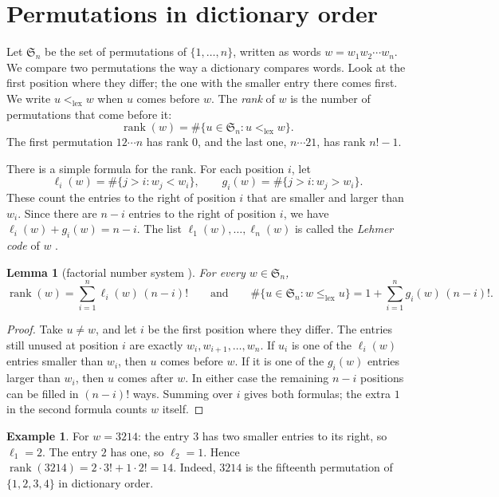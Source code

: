 \documentclass[11pt]{amsart}
\theoremstyle{plain}
\newtheorem{lemma}[theorem]{Lemma}
\theoremstyle{definition}
\newtheorem{example}[theorem]{Example}
\theoremstyle{remark}
\newcommand{\Sym}{\mathfrak{S}}
\newcommand{\lex}{<_{\mathrm{lex}}}
\newcommand{\lexeq}{\le_{\mathrm{lex}}}
\newcommand{\rank}{\operatorname{rank}}
\begin{document}
\section{Permutations in dictionary order}\label{sec:prelim}

Let $\Sym_n$ be the set of permutations of $\{1,\dots,n\}$, written as words
$w=w_1w_2\cdots w_n$. We compare two permutations the way a dictionary compares
words. Look at the first position where they differ; the one with the smaller
entry there comes first. We write $u\lex w$ when $u$ comes before $w$. The
\emph{rank} of $w$ is the number of permutations that come before it:
\[
  \rank(w)=\#\{u\in\Sym_n : u\lex w\}.
\]
The first permutation $12\cdots n$ has rank $0$, and the last one,
$n\cdots21$, has rank $n!-1$.

There is a simple formula for the rank. For each position $i$, let
\[
  \ell_i(w)=\#\{j>i : w_j<w_i\},\qquad g_i(w)=\#\{j>i : w_j>w_i\}.
\]
These count the entries to the right of position $i$ that are smaller and
larger than $w_i$. Since there are $n-i$ entries to the right of position $i$,
we have $\ell_i(w)+g_i(w)=n-i$. The list $\ell_1(w),\dots,\ell_n(w)$ is called
the \emph{Lehmer code} of $w$ \cite{Lehmer,Laisant}.

\begin{lemma}[factorial number system \cite{Lehmer,TAOCP4A}]\label{lem:rank}
For every $w\in\Sym_n$,
\[
  \rank(w)=\sum_{i=1}^{n}\ell_i(w)\,(n-i)!
  \qquad\text{and}\qquad
  \#\{u\in\Sym_n : w\lexeq u\}=1+\sum_{i=1}^{n}g_i(w)\,(n-i)!.
\]
\end{lemma}

\begin{proof}
Take $u\neq w$, and let $i$ be the first position where they differ. The
entries still unused at position $i$ are exactly $w_i,w_{i+1},\dots,w_n$. If
$u_i$ is one of the $\ell_i(w)$ entries smaller than $w_i$, then $u$ comes
before $w$. If it is one of the $g_i(w)$ entries larger than $w_i$, then $u$
comes after $w$. In either case the remaining $n-i$ positions can be filled in
$(n-i)!$ ways. Summing over $i$ gives both formulas; the extra $1$ in the
second formula counts $w$ itself.
\end{proof}

\begin{example}
For $w=3214$: the entry $3$ has two smaller entries to its right, so
$\ell_1=2$. The entry $2$ has one, so $\ell_2=1$. Hence
$\rank(3214)=2\cdot3!+1\cdot2!=14$. Indeed, $3214$ is the fifteenth
permutation of $\{1,2,3,4\}$ in dictionary order.
\end{example}
\end{document}
